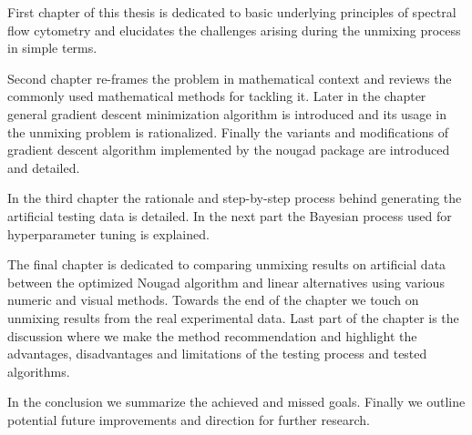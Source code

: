 First chapter of this thesis is dedicated to basic underlying principles of spectral flow cytometry and elucidates the challenges arising during the unmixing process in simple terms.  

Second chapter re-frames the problem in mathematical context and reviews the commonly used mathematical methods for tackling it. Later in the chapter general gradient descent minimization algorithm is introduced and its usage in the unmixing problem is rationalized. Finally the variants and modifications of gradient descent algorithm implemented by the nougad package are introduced and detailed. 

In the third chapter the rationale and step-by-step process behind generating the artificial testing data is detailed. In the next part the Bayesian process used for hyperparameter tuning is explained. 

The final chapter is dedicated to comparing unmixing results on artificial data between the optimized Nougad algorithm and linear alternatives using various numeric and visual methods. Towards the end of the chapter we touch on unmixing results from the real experimental data. Last part of the chapter is the discussion where we make the method recommendation and highlight the advantages, disadvantages and limitations of the testing process and tested algorithms.

In the conclusion we summarize the achieved and missed goals. Finally we outline potential future improvements and direction for further research.
